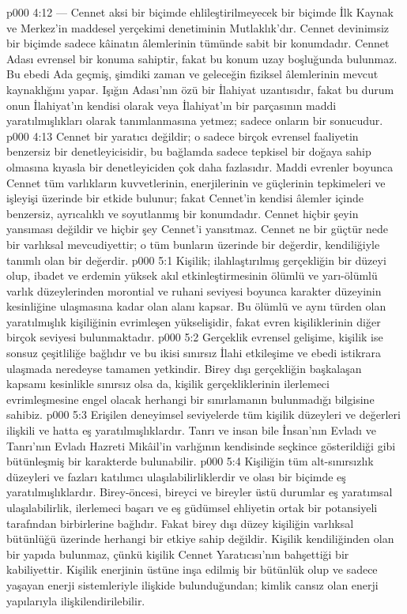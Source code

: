 \vs p000 4:12  --- Cennet aksi bir biçimde ehlileştirilmeyecek bir biçimde İlk Kaynak ve Merkez’in maddesel yerçekimi denetiminin Mutlaklık’dır. Cennet devinimsiz bir biçimde sadece kâinatın âlemlerinin tümünde sabit bir konumdadır. Cennet Adası evrensel bir konuma sahiptir, fakat bu konum uzay boşluğunda bulunmaz. Bu ebedi Ada geçmiş, şimdiki zaman ve geleceğin fiziksel âlemlerinin mevcut kaynaklığını yapar. Işığın Adası’nın özü bir İlahiyat uzantısıdır, fakat bu durum onun İlahiyat’ın kendisi olarak veya İlahiyat’ın bir parçasının maddi yaratılmışlıkları olarak tanımlanmasına yetmez; sadece onların bir sonucudur.
\vs p000 4:13 Cennet bir yaratıcı değildir; o sadece birçok evrensel faaliyetin benzersiz bir denetleyicisidir, bu bağlamda sadece tepkisel bir doğaya sahip olmasına kıyasla bir denetleyiciden çok daha fazlasıdır. Maddi evrenler boyunca Cennet tüm varlıkların kuvvetlerinin, enerjilerinin ve güçlerinin tepkimeleri ve işleyişi üzerinde bir etkide bulunur; fakat Cennet’in kendisi âlemler içinde benzersiz, ayrıcalıklı ve soyutlanmış bir konumdadır. Cennet hiçbir şeyin yansıması değildir ve hiçbir şey Cennet’i yansıtmaz. Cennet ne bir güçtür nede bir varlıksal mevcudiyettir; o tüm bunların üzerinde bir değerdir,  kendiliğiyle tanımlı olan bir değerdir.
\vs p000 5:1 Kişilik; ilahlaştırılmış gerçekliğin bir düzeyi olup, ibadet ve erdemin yüksek akıl etkinleştirmesinin ölümlü ve yarı\hyp{}ölümlü varlık düzeylerinden morontial ve ruhani seviyesi boyunca karakter düzeyinin kesinliğine ulaşmasına kadar olan alanı kapsar. Bu ölümlü ve aynı türden olan yaratılmışlık kişiliğinin evrimleşen yükselişidir, fakat evren kişiliklerinin diğer birçok seviyesi bulunmaktadır.
\vs p000 5:2 Gerçeklik evrensel gelişime, kişilik ise sonsuz çeşitliliğe bağlıdır ve bu ikisi sınırsız İlahi etkileşime ve ebedi istikrara ulaşmada neredeyse tamamen yetkindir. Birey dışı gerçekliğin başkalaşan kapsamı kesinlikle sınırsız olsa da, kişilik gerçekliklerinin ilerlemeci evrimleşmesine engel olacak herhangi bir sınırlamanın bulunmadığı bilgisine sahibiz.
\vs p000 5:3 Erişilen deneyimsel seviyelerde tüm kişilik düzeyleri ve değerleri ilişkili ve hatta eş yaratılmışlıklardır. Tanrı ve insan bile İnsan’nın Evladı ve Tanrı’nın Evladı Hazreti Mikâil’in varlığının kendisinde seçkince gösterildiği gibi bütünleşmiş bir karakterde bulunabilir.
\vs p000 5:4 Kişiliğin tüm alt\hyp{}sınırsızlık düzeyleri ve fazları katılımcı ulaşılabilirliklerdir ve olası bir biçimde eş yaratılmışlıklardır. Birey\hyp{}öncesi, bireyci ve bireyler üstü durumlar eş yaratımsal ulaşılabilirlik, ilerlemeci başarı ve eş güdümsel ehliyetin ortak bir potansiyeli tarafından birbirlerine bağlıdır. Fakat birey dışı düzey kişiliğin varlıksal bütünlüğü üzerinde herhangi bir etkiye sahip değildir. Kişilik kendiliğinden olan bir yapıda bulunmaz, çünkü kişilik Cennet Yaratıcısı’nın bahşettiği bir kabiliyettir. Kişilik enerjinin üstüne inşa edilmiş bir bütünlük olup ve sadece yaşayan enerji sistemleriyle ilişkide bulunduğundan; kimlik cansız olan enerji yapılarıyla ilişkilendirilebilir.
